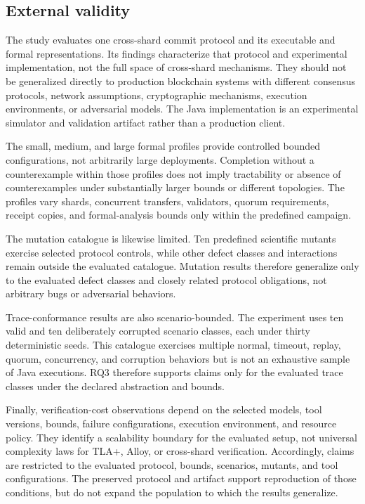 \subsection{External validity}
\label{subsec:external-validity}

The study evaluates one cross-shard commit protocol and its executable and
formal representations. Its findings characterize that protocol and
experimental implementation, not the full space of cross-shard mechanisms.
They should not be generalized directly to production blockchain systems with
different consensus protocols, network assumptions, cryptographic mechanisms,
execution environments, or adversarial models. The Java implementation is an
experimental simulator and validation artifact rather than a production
client.

The small, medium, and large formal profiles provide controlled bounded
configurations, not arbitrarily large deployments. Completion without a
counterexample within those profiles does not imply tractability or absence of
counterexamples under substantially larger bounds or different topologies. The
profiles vary shards, concurrent transfers, validators, quorum requirements,
receipt copies, and formal-analysis bounds only within the predefined campaign.

The mutation catalogue is likewise limited. Ten predefined scientific mutants
exercise selected protocol controls, while other defect classes and
interactions remain outside the evaluated catalogue. Mutation results therefore
generalize only to the evaluated defect classes and closely related protocol
obligations, not arbitrary bugs or adversarial behaviors.

Trace-conformance results are also scenario-bounded. The experiment uses ten
valid and ten deliberately corrupted scenario classes, each under thirty
deterministic seeds. This catalogue exercises multiple normal, timeout, replay,
quorum, concurrency, and corruption behaviors but is not an exhaustive sample
of Java executions. RQ3 therefore supports claims only for the evaluated trace
classes under the declared abstraction and bounds.

Finally, verification-cost observations depend on the selected models, tool
versions, bounds, failure configurations, execution environment, and resource
policy. They identify a scalability boundary for the evaluated setup, not
universal complexity laws for TLA+, Alloy, or cross-shard verification.
Accordingly, claims are restricted to the evaluated protocol, bounds,
scenarios, mutants, and tool configurations. The preserved protocol and
artifact support reproduction of those conditions, but do not expand the
population to which the results generalize.

